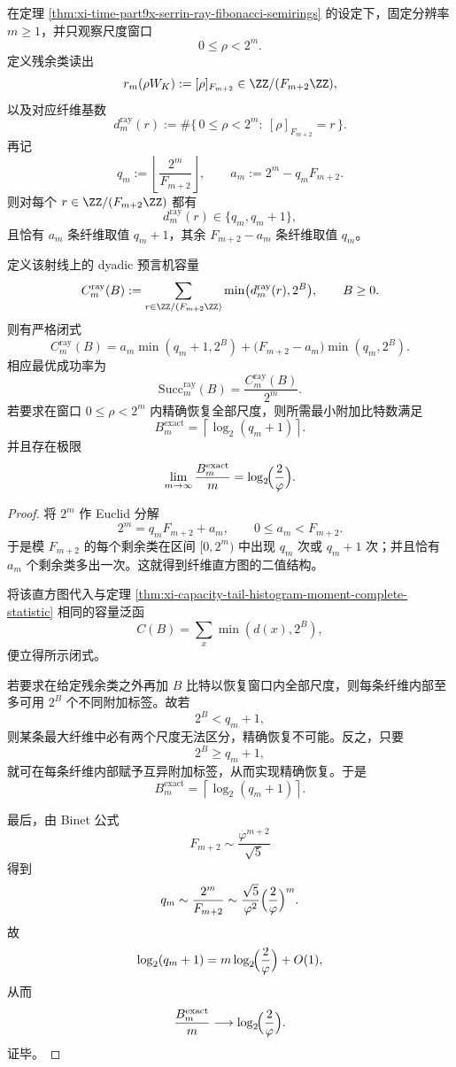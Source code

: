 \begin{corollary}\label{cor:xi-time-part9x-serrin-ray-exact-capacity}
在定理 \ref{thm:xi-time-part9x-serrin-ray-fibonacci-semirings} 的设定下，固定分辨率 \(m\ge 1\)，并只观察尺度窗口
\[
0\le \rho<2^m.
\]
定义残余类读出
\[
r_m(\rho W_K):=[\rho]_{F_{m+2}}
\in
\ZZ/(F_{m+2}\ZZ),
\]
以及对应纤维基数
\[
d_m^{\mathrm{ray}}(r)
:=
\#\{\,0\le \rho<2^m:\ [\rho]_{F_{m+2}}=r\,\}.
\]
再记
\[
q_m:=\left\lfloor\frac{2^m}{F_{m+2}}\right\rfloor,
\qquad
a_m:=2^m-q_mF_{m+2}.
\]
则对每个 \(r\in \ZZ/(F_{m+2}\ZZ)\) 都有
\[
d_m^{\mathrm{ray}}(r)\in\{q_m,q_m+1\},
\]
且恰有 \(a_m\) 条纤维取值 \(q_m+1\)，其余 \(F_{m+2}-a_m\) 条纤维取值 \(q_m\)。

定义该射线上的 dyadic 预言机容量
\[
C_m^{\mathrm{ray}}(B)
:=
\sum_{r\in \ZZ/(F_{m+2}\ZZ)}
\min\bigl(d_m^{\mathrm{ray}}(r),2^B\bigr),
\qquad
B\ge 0.
\]
则有严格闭式
\[
C_m^{\mathrm{ray}}(B)
=
a_m\min(q_m+1,2^B)
+
\bigl(F_{m+2}-a_m\bigr)\min(q_m,2^B).
\]
相应最优成功率为
\[
\mathrm{Succ}_m^{\mathrm{ray}}(B)
=
\frac{C_m^{\mathrm{ray}}(B)}{2^m}.
\]
若要求在窗口 \(0\le \rho<2^m\) 内精确恢复全部尺度，则所需最小附加比特数满足
\[
B_m^{\mathrm{exact}}
=
\left\lceil \log_2(q_m+1)\right\rceil.
\]
并且存在极限
\[
\lim_{m\to\infty}\frac{B_m^{\mathrm{exact}}}{m}
=
\log_2\!\Bigl(\frac{2}{\varphi}\Bigr).
\]
\end{corollary}
\begin{proof}
将 \(2^m\) 作 Euclid 分解
\[
2^m=q_mF_{m+2}+a_m,
\qquad
0\le a_m<F_{m+2}.
\]
于是模 \(F_{m+2}\) 的每个剩余类在区间 \([0,2^m)\) 中出现 \(q_m\) 次或 \(q_m+1\) 次；并且恰有 \(a_m\) 个剩余类多出一次。这就得到纤维直方图的二值结构。

将该直方图代入与定理 \ref{thm:xi-capacity-tail-histogram-moment-complete-statistic} 相同的容量泛函
\[
C(B)=\sum_x\min(d(x),2^B),
\]
便立得所示闭式。

若要求在给定残余类之外再加 \(B\) 比特以恢复窗口内全部尺度，则每条纤维内部至多可用 \(2^B\) 个不同附加标签。故若
\[
2^B<q_m+1,
\]
则某条最大纤维中必有两个尺度无法区分，精确恢复不可能。反之，只要
\[
2^B\ge q_m+1,
\]
就可在每条纤维内部赋予互异附加标签，从而实现精确恢复。于是
\[
B_m^{\mathrm{exact}}
=
\left\lceil \log_2(q_m+1)\right\rceil.
\]

最后，由 Binet 公式
\[
F_{m+2}\sim \frac{\varphi^{m+2}}{\sqrt5}
\]
得到
\[
q_m
\sim
\frac{2^m}{F_{m+2}}
\sim
\frac{\sqrt5}{\varphi^2}
\Bigl(\frac{2}{\varphi}\Bigr)^m.
\]
故
\[
\log_2(q_m+1)
=
m\log_2\!\Bigl(\frac{2}{\varphi}\Bigr)+O(1),
\]
从而
\[
\frac{B_m^{\mathrm{exact}}}{m}\longrightarrow \log_2\!\Bigl(\frac{2}{\varphi}\Bigr).
\]
证毕。
\end{proof}

